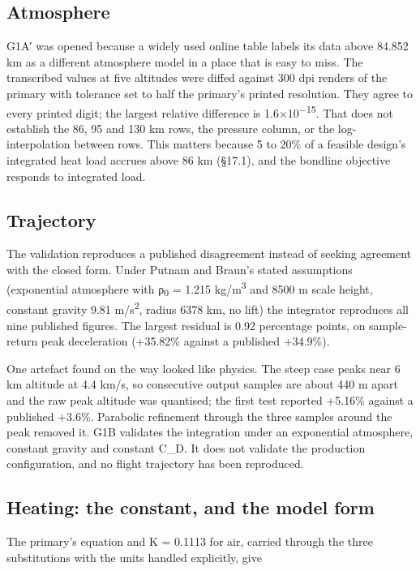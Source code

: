 \documentclass[
  a4paper,
  11pt]{article}
\begin{document}
\subsection{Atmosphere}

G1A{\symfont ′} was opened because a widely used online table labels its
data above 84.852 km as a different atmosphere model in a place that is
easy to miss. The transcribed values at five altitudes were diffed
against 300 dpi renders of the primary with tolerance set to half the
primary's printed resolution. They agree to every printed digit; the
largest relative difference is 1.6×10\textsuperscript{−15}. That does
not establish the 86, 95 and 130 km rows, the pressure column, or the
log-interpolation between rows. This matters because 5 to 20\% of a
feasible design's integrated heat load accrues above 86 km (§17.1), and
the bondline objective responds to integrated load.

\subsection{Trajectory}

The validation reproduces a published disagreement instead of seeking
agreement with the closed form. Under Putnam and Braun's stated
assumptions (exponential atmosphere with ρ\textsubscript{0} = 1.215
kg/m\textsuperscript{3} and 8500 m scale height, constant gravity 9.81
m/s\textsuperscript{2}, radius 6378 km, no lift) the integrator
reproduces all nine published figures. The largest residual is 0.92
percentage points, on sample-return peak deceleration (+35.82\% against
a published +34.9\%).

One artefact found on the way looked like physics. The steep case peaks
near 6 km altitude at 4.4 km/s, so consecutive output samples are about
440 m apart and the raw peak altitude was quantised; the first test
reported +5.16\% against a published +3.6\%. Parabolic refinement
through the three samples around the peak removed it. G1B validates the
integration under an exponential atmosphere, constant gravity and
constant C\_D. It does not validate the production configuration, and no
flight trajectory has been reproduced.

\subsection{Heating: the constant, and the model form}

The primary's equation and K = 0.1113 for air, carried through the three
substitutions with the units handled explicitly, give
\end{document}
